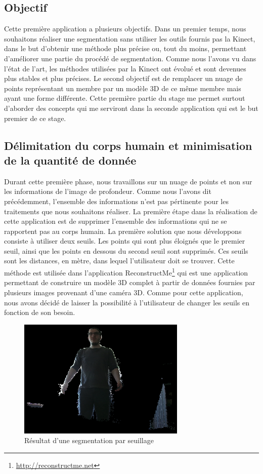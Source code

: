 \subsection{Objectif}
Cette première application a plusieurs objectifs. Dans un premier temps, nous souhaitons réaliser 
une segmentation sans utiliser les outils fournis pas la Kinect, dans le but d'obtenir une méthode plus
précise ou, tout du moins, permettant d'améliorer une partie du procédé de segmentation. Comme nous l'avons vu dans 
l'état de l'art, les méthodes utilisées par la Kinect ont évolué et sont devenues plus stables et plus précises.
Le second objectif est de remplacer un nuage de points représentant un membre par un modèle 3D de ce même membre
mais ayant une forme différente. Cette première partie du stage me permet surtout d'aborder des concepts qui me 
serviront dans la seconde application qui est le but premier de ce stage.

\subsection{Délimitation du corps humain et minimisation de la quantité de donnée}
Durant cette première phase, nous travaillons sur un nuage de points et non sur les informations de l'image de profondeur.
Comme nous l'avons dit précédemment, l'ensemble des informations n'est pas pértinente pour les traitements que nous souhaitons
réaliser. La première étape dans la réalisation de cette application est de supprimer l'ensemble des informations qui ne se rapportent pas 
au corps humain. La première solution que nous développons consiste à utiliser deux seuils. Les points qui sont plus éloignés que le 
premier seuil, ainsi que les points en dessous du second seuil sont supprimés. 
Ces seuils sont les distances, en mètre, dans lequel l'utilisateur doit se trouver. Cette méthode est utilisée dans 
l'application ReconstructMe\footnote{\url{http://reconstructme.net}} qui est une application permettant de construire un modèle
3D complet à partir de données fournies par plusieurs images provenant d'une caméra 3D. Comme pour cette application, nous avons
décidé de laisser la possibilité à l'utilisateur de changer les seuils en fonction de son besoin.\\

\begin{figure}[!ht]
  \begin{center}
    \includegraphics[width=8cm]{image/seuil1.PNG}
    \caption{Résultat d'une segmentation par seuillage}
    \label{fig:seuillage}
  \end{center}
\end{figure}

